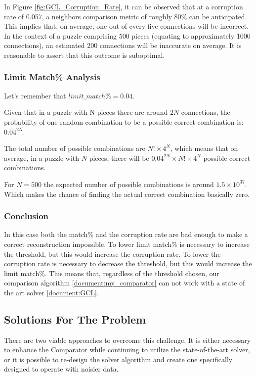 \documentclass{article}
\begin{document}
In Figure \cref{fig:GCL_Corruption_Rate}, it can be observed that at a corruption rate of 0.057,
a neighbors comparison metric of roughly 80\% can be anticipated.
This implies that, on average, one out of every five connections will be incorrect.
In the context of a puzzle comprising 500 pieces (equating to approximately 1000 connections),
an estimated 200 connections will be inaccurate on average.
It is reasonable to assert that this outcome is suboptimal.

\subsubsection{Limit Match\% Analysis}
Let's remember that \(limit\_match\% = 0.04\).

Given that in a puzzle with N pieces there are around \(2N \) connections,
the probability of one random combination to be a
possible correct combination is: \(0.04^{2N}\).

The total number of possible combinations are \(N! \times 4^N\),
which means that on average, in a puzzle with \(N\) pieces,
there will be \(0.04^{2N} \times N! \times 4^N \)
possible correct combinations.

For \( N = 500 \) the expected number of possible combinations is around \( 1.5 \times 10^{37} \).
Which makes the chance of finding the actual correct combination basically zero.
\subsubsection{Conclusion}
In this case both the match\% and the corruption rate are bad enough to make a correct reconstruction impossible.
To lower limit match\% is necessary to increase the threshold, but this would increase the corruption rate.
To lower the corruption rate is necessary to decrease the threshold, but this would increase the limit match\%.
This means that, regardless of the threshold chosen, our comparison algorithm \cref{document:my_comparator}
can not work with a state of the art solver \cref{document:GCL}.

\subsection{Solutions For The Problem}

There are two viable approaches to overcome this challenge.
It is either necessary to enhance the Comparator while continuing
to utilize the state-of-the-art solver,
or it is possible to re-design the solver algorithm and create one
specifically designed to operate with noisier data.
\end{document}
